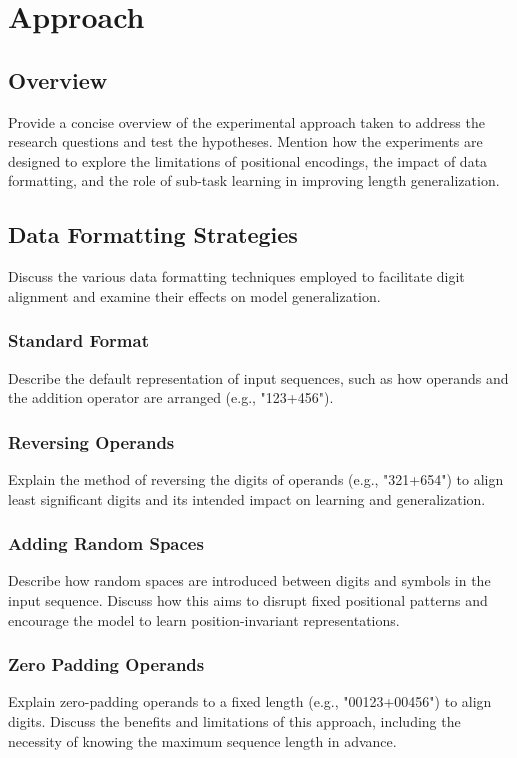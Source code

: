 \chapter{Approach}\label{approach}

\section{Overview}
\label{sec:overview}
Provide a concise overview of the experimental approach taken to address the research questions and test the hypotheses. Mention how the experiments are designed to explore the limitations of positional encodings, the impact of data formatting, and the role of sub-task learning in improving length generalization.

\section{Data Formatting Strategies}
\label{sec:data_formatting}
Discuss the various data formatting techniques employed to facilitate digit alignment and examine their effects on model generalization.

\subsection{Standard Format}
Describe the default representation of input sequences, such as how operands and the addition operator are arranged (e.g., "123+456").

\subsection{Reversing Operands}
Explain the method of reversing the digits of operands (e.g., "321+654") to align least significant digits and its intended impact on learning and generalization.

\subsection{Adding Random Spaces}
Describe how random spaces are introduced between digits and symbols in the input sequence. Discuss how this aims to disrupt fixed positional patterns and encourage the model to learn position-invariant representations.

\subsection{Zero Padding Operands}
Explain zero-padding operands to a fixed length (e.g., "00123+00456") to align digits. Discuss the benefits and limitations of this approach, including the necessity of knowing the maximum sequence length in advance.

